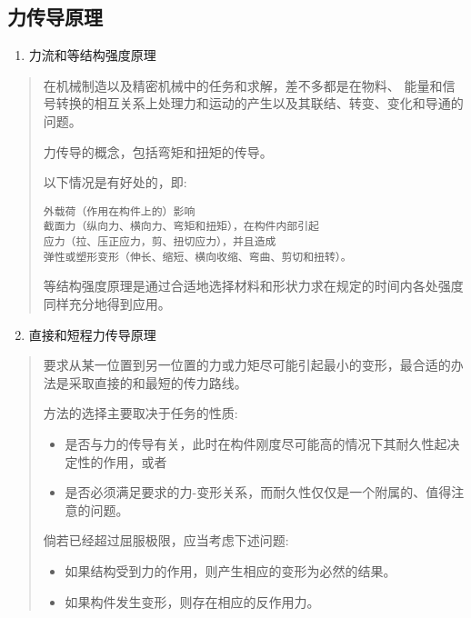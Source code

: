 \documentclass[letterpaper,10pt,english]{sphinxmanual}
\begin{document}
\subsection{力传导原理}
\label{unit6:id9}\begin{enumerate}
\item {} 
力流和等结构强度原理

\end{enumerate}
\begin{quote}

在机械制造以及精密机械中的任务和求解，差不多都是在物料、
能量和信号转换的相互关系上处理力和运动的产生以及其联结、转变、变化和导通的问题。

力传导的概念，包括弯矩和扭矩的传导。

以下情况是有好处的，即:

\begin{Verbatim}[commandchars=\\\{\}]
外载荷（作用在构件上的）影响
截面力（纵向力、横向力、弯矩和扭矩），在构件内部引起
应力（拉、压正应力，剪、扭切应力），并且造成
弹性或塑形变形（伸长、缩短、横向收缩、弯曲、剪切和扭转）。
\end{Verbatim}

等结构强度原理是通过合适地选择材料和形状力求在规定的时间内各处强度同样充分地得到应用。
\end{quote}
\begin{enumerate}
\setcounter{enumi}{1}
\item {} 
直接和短程力传导原理

\end{enumerate}
\begin{quote}

要求从某一位置到另一位置的力或力矩尽可能引起最小的变形，最合适的办法是采取直接的和最短的传力路线。

方法的选择主要取决于任务的性质:
\begin{itemize}
\item {} 
是否与力的传导有关，此时在构件刚度尽可能高的情况下其耐久性起决定性的作用，或者

\item {} 
是否必须满足要求的力-变形关系，而耐久性仅仅是一个附属的、值得注意的问题。

\end{itemize}

倘若已经超过屈服极限，应当考虑下述问题:
\begin{itemize}
\item {} 
如果结构受到力的作用，则产生相应的变形为必然的结果。

\item {} 
如果构件发生变形，则存在相应的反作用力。

\end{itemize}
\end{quote}
\end{document}
